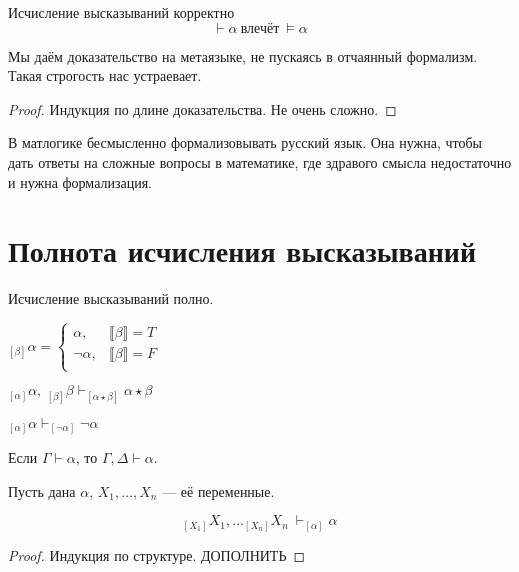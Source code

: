 \begin{theorem}
    Исчисление высказываний корректно
    \[ \vdash \alpha\ \text{влечёт}\ \vDash \alpha \]
\end{theorem}
Мы даём доказательство на метаязыке, не пускаясь в отчаянный формализм.
Такая строгость нас устраевает.
\begin{proof}
    Индукция по длине доказательства. 
    Не очень сложно.
\end{proof}

В матлогике бесмысленно формализовывать русский язык.
Она нужна, чтобы дать ответы на сложные вопросы в математике, где здравого смысла недостаточно и нужна формализация.

\section{Полнота исчисления высказываний}
\begin{theorem}
    Исчисление высказываний полно.
\end{theorem}

\begin{definition}
    $_{[\beta]}\alpha = 
    \begin{cases}
        \alpha, & \llbracket \beta \rrbracket = T\\
        \neg \alpha,&  \llbracket \beta \rrbracket = F\\
    \end{cases}$
\end{definition}

\begin{lemma}
    $_{[\alpha]}\alpha,\ _{[\beta]}\beta \vdash _{[\alpha \star \beta]} \alpha \star \beta$ 

    $_{[\alpha]} \alpha \vdash _{[\neg \alpha]}\neg\alpha $
\end{lemma}

\begin{lemma}
Если $\Gamma \vdash \alpha$, то $\Gamma, \Delta \vdash \alpha$.
\end{lemma}

\begin{lemma} 
Пусть дана $\alpha$, $X_1,\ldots, X_n$ --- её переменные.   

\[ _{[X_1]}X_1,\ldots _{[X_n]}X_n\ \vdash _{[\alpha]}\alpha  \]
\end{lemma}
\begin{proof}
    Индукция по структуре. ДОПОЛНИТЬ
\end{proof}

